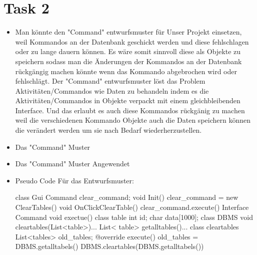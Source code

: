 \chapter{Task 2}
\begin{itemize}
   \item Man könnte den "Command" entwurfsmuster für Unser Projekt einsetzen, weil Kommandos an der Datenbank geschickt werden und diese fehlschlagen oder zu lange dauern können. Es wäre somit sinnvoll diese als Objekte zu speichern sodass man die Änderungen der Kommandos an der Datenbank rückgängig machen könnte wenn das Kommando abgebrochen wird oder fehlschlägt. Der "Command" entwurfsmuster löst das Problem Aktivitäten/Commandos wie Daten zu behandeln indem es die Aktivitäten/Commandos in Objekte verpackt mit einem gleichbleibenden Interface. Und das erlaubt es auch diese Kommandos rückgänig zu machen weil die verschiedenen Kommando Objekte auch die Daten speichern können die verändert werden um sie nach Bedarf wiederherzustellen.
   \item Das "Command" Muster
   \item Das "Command" Muster Angewendet
   \item Pseudo Code Für das Entwurfsmuster: 
   
   class Gui{
	Command  clear_command; 
	void Init(){
		clear_command = new ClearTables()
	}
	void OnClickClearTable(){
		clear_command.execute()
	}
}
Interface Command{
	void exectue()
}
class table{
	int id;
	char data[1000];
}
class DBMS{
	void cleartables(List<table>){...}
	List< table> getalltables(){...}
}
class cleartables{
	List<tables> old_tables;
	@override
	execute(){
		old_tables = DBMS.getalltabels()
		DBMS.cleartables(DBMS.getalltabels())
	}
}

\end{itemize}
